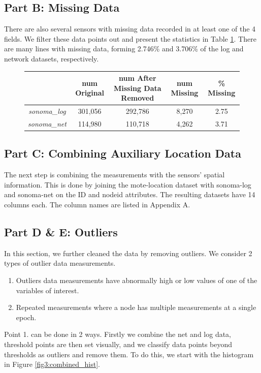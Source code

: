 \documentclass[11pt, letterpaper]{article}
\begin{document}
\subsection{Part B: Missing Data}
There are also several sensors with missing data recorded in at least one of the 4 fields. We filter these data points out and present the statistics in Table \ref{table:data_info}. There are many lines with missing data, forming 2.746\% and 3.706\% of the log and network datasets, respectively.

\begin{figure}[h!]
\captionsetup{justification=centering}
\centering
\begin{tabular}{ |c|c|c|c|c| } 
    \hline & num Original & num After Missing Data Removed & num Missing & \% Missing \\
    \hline
    \textit{sonoma\_log} & 301,056 & 292,786 & 8,270 &2.75\\ 
    \textit{sonoma\_net}  & 114,980 & 110,718 & 4,262 & 3.71\\
    \hline
\end{tabular}
\label{table:data_info}
\end{figure}

\subsection{Part C: Combining Auxiliary Location Data}
The next step is combining the measurements with the sensors' spatial information. This is done by joining the mote-location dataset with sonoma-log and sonoma-net on the ID and nodeid attributes. The resulting datasets have 14 columns each. The column names are listed in Appendix A.


\subsection{Part D \& E: Outliers}
In this section, we further cleaned the data by removing outliers. We consider 2 types of outlier data measurements. 
\begin{enumerate}
    \item Outliers data measurements have abnormally high or low values of one of the variables of interest.
    \item Repeated measurements where a node has multiple measurements at a single epoch.
\end{enumerate}
Point 1. can be done in 2 ways. Firstly we combine the net and log data, threshold points are then set visually, and we classify data points beyond thresholds as outliers and remove them. To do this, we start with the histogram in Figure \ref{fig3:combined_hist}. 
\end{document}
